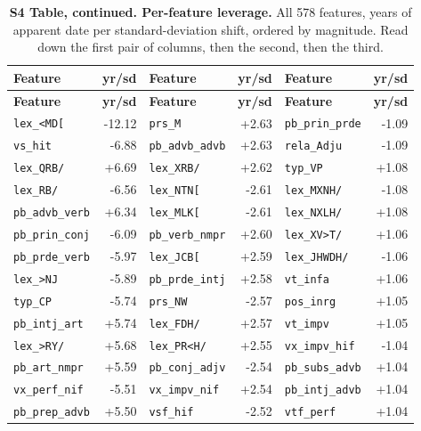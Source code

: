 \begingroup\scriptsize
\setlength{\tabcolsep}{3pt}
\begin{longtable}{lrlrlr}
\caption{{\bf S4 Table, continued. Per-feature leverage.}  All 578 features, years of apparent date per standard-deviation shift, ordered by magnitude.  Read down the first pair of columns, then the second, then the third.}
\label{tab:s4full}\\
\toprule
\textbf{Feature} & \textbf{yr/sd} & \textbf{Feature} & \textbf{yr/sd} & \textbf{Feature} & \textbf{yr/sd} \\
\midrule
\endfirsthead
\toprule
\textbf{Feature} & \textbf{yr/sd} & \textbf{Feature} & \textbf{yr/sd} & \textbf{Feature} & \textbf{yr/sd} \\
\midrule
\endhead
\bottomrule
\endfoot
\texttt{lex\_\textless{}MD[} & -12.12 & \texttt{prs\_M} & +2.63 & \texttt{pb\_prin\_prde} & -1.09 \\
\texttt{vs\_hit} & -6.88 & \texttt{pb\_advb\_advb} & +2.63 & \texttt{rela\_Adju} & -1.09 \\
\texttt{lex\_QRB/} & +6.69 & \texttt{lex\_XRB/} & +2.62 & \texttt{typ\_VP} & +1.08 \\
\texttt{lex\_RB/} & -6.56 & \texttt{lex\_NTN[} & -2.61 & \texttt{lex\_MXNH/} & -1.08 \\
\texttt{pb\_advb\_verb} & +6.34 & \texttt{lex\_MLK[} & -2.61 & \texttt{lex\_NXLH/} & +1.08 \\
\texttt{pb\_prin\_conj} & -6.09 & \texttt{pb\_verb\_nmpr} & +2.60 & \texttt{lex\_XV\textgreater{}T/} & +1.06 \\
\texttt{pb\_prde\_verb} & -5.97 & \texttt{lex\_JCB[} & +2.59 & \texttt{lex\_JHWDH/} & -1.06 \\
\texttt{lex\_\textgreater{}NJ} & -5.89 & \texttt{pb\_prde\_intj} & +2.58 & \texttt{vt\_infa} & +1.06 \\
\texttt{typ\_CP} & -5.74 & \texttt{prs\_NW} & -2.57 & \texttt{pos\_inrg} & +1.05 \\
\texttt{pb\_intj\_art} & +5.74 & \texttt{lex\_FDH/} & +2.57 & \texttt{vt\_impv} & +1.05 \\
\texttt{lex\_\textgreater{}RY/} & +5.68 & \texttt{lex\_PR\textless{}H/} & +2.55 & \texttt{vx\_impv\_hif} & -1.04 \\
\texttt{pb\_art\_nmpr} & +5.59 & \texttt{pb\_conj\_adjv} & -2.54 & \texttt{pb\_subs\_advb} & +1.04 \\
\texttt{vx\_perf\_nif} & -5.51 & \texttt{vx\_impv\_nif} & +2.54 & \texttt{pb\_intj\_advb} & +1.04 \\
\texttt{pb\_prep\_advb} & +5.50 & \texttt{vsf\_hif} & -2.52 & \texttt{vtf\_perf} & +1.04 \\

\end{longtable}
